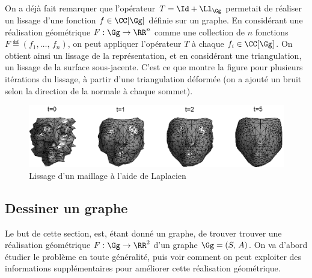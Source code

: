 \paraspace
On a déjà fait remarquer que l'opérateur $T = \Id+\Ll_\Gg$ permetait de réaliser un lissage d'une fonction $f \in \CC[\Gg]$ définie sur un graphe. En considérant une réalisation géométrique $F : \Gg \rightarrow \RR^n$ comme une collection de $n$ fonctions $F \eqdef (f_1,\ldots,\,f_n)$, on peut appliquer l'opérateur $T$ à chaque $f_i \in \CC[\Gg]$. On obtient ainsi un lissage de la représentation, et en considérant une triangulation, un lissage de la surface sous-jacente. C'est ce que montre la figure  pour plusieurs itérations du lissage, à partir d'une triangulation déformée (on a ajouté un bruit selon la direction de la normale à chaque sommet).\begin{figure}[ht] 
    \begin{center}
    \includegraphics[scale=0.7]{images/graph-smoothing.eps}
    \end{center}
    \caption{Lissage d'un maillage à l'aide de Laplacien}
	 \label{fig-graph-smoothing}
\end{figure}

\subsection{Dessiner un graphe}
\label{sect2-dessiner-graphe} 


Le but de cette section, est, étant donné un graphe, de trouver trouver une réalisation géométrique $F : \Gg \rightarrow \RR^2$ d'un graphe $\Gg = (S,\,A)$. On va d'abord étudier le problème en toute généralité, puis voir comment on peut exploiter des informations supplémentaires pour améliorer cette réalisation géométrique.

